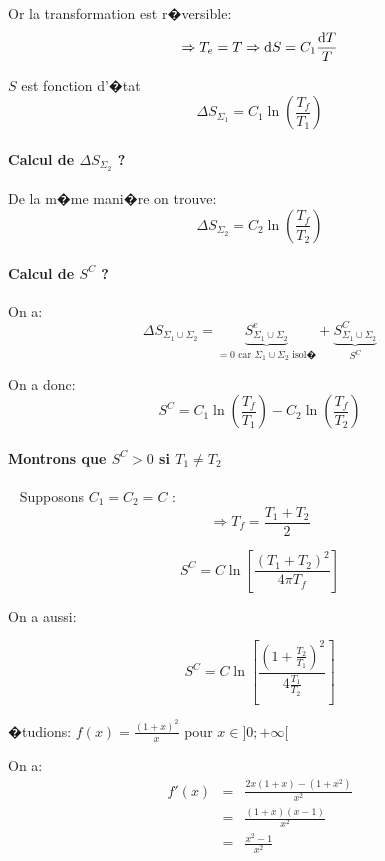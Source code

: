 Or la transformation est r�versible:
\[
	\Rightarrow T_e = T \Rightarrow \mathrm{d} S = C_1 \frac{\mathrm{d} T}{T}
\]

$ S $ est fonction d'�tat
\[
	\boxed{\Delta S_{\Sigma_1} = C_1 \ln \left(\frac{T_f}{T_1}\right)}
\]

\paragraph{Calcul de $\Delta S_{\Sigma_2}$ ?}
De la m�me mani�re on trouve:
\[
	\boxed{\Delta S_{\Sigma_2} = C_2 \ln\left(\frac{T_f}{T_2}\right)}
\]

\paragraph{Calcul de $S^C$ ?}
On a:
\[
	\Delta S_{\Sigma_1 \cup \Sigma_2} = 
	\underbrace{S^e_{\Sigma_1 \cup \Sigma_2}}_{= 0 \text{ car $\Sigma_1 \cup \Sigma_2 $ isol�}} + 
	\underbrace{S^C_{\Sigma_1 \cup \Sigma_2}}_{S^C}
\]

On a donc:
\[
	\boxed{S^C = C_1 \ln \left(\frac{T_f}{T_1}\right) - C_2 \ln \left(\frac{T_f}{T_2}\right)}
\]


\paragraph{Montrons que $ S^C > 0 $ si $ T_1 \neq T_2 $}
~\newline
Supposons $ C_1 = C_2 = C$ :
\[
	\Rightarrow T_f = \frac{T_1 + T_2}{2}
\]

\[
	\boxed{S^C = C \ln \left[ \frac{(T_1 + T_2)^2}{4 \pi T_f} \right]}
\]

On a aussi:

\[
 S^C = C \ln \left[ \frac{\left( 1 + \frac{T_2}{T_1}\right)^2}{4 \frac{T_1}{T_2}} \right]
\]

�tudions: $ f(x) = \frac{(1 + x)^2}{x} $ pour $ x \in ] 0 ; +\infty [ $

On a: 
\begin{eqnarray*}
	f'(x) 	& = & \frac{2x (1 + x) - (1 + x^2)}{x^2}\\
		& = & \frac{(1 + x)(x - 1)}{x^2}\\
		& = & \frac{x^2 - 1}{x^2}
\end{eqnarray*}




